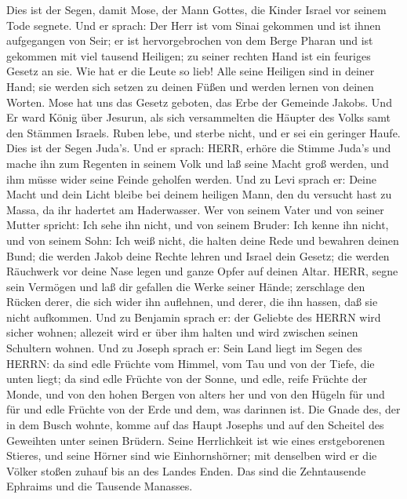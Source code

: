  Dies ist der Segen, damit Mose, der Mann Gottes, die Kinder
Israel vor seinem Tode segnete.  Und er sprach: Der Herr ist
vom Sinai gekommen und ist ihnen aufgegangen von Seir; er ist
hervorgebrochen von dem Berge Pharan und ist gekommen mit viel tausend
Heiligen; zu seiner rechten Hand ist ein feuriges Gesetz an sie.
 Wie hat er die Leute so lieb! Alle seine Heiligen sind in
deiner Hand; sie werden sich setzen zu deinen Füßen und werden lernen
von deinen Worten.  Mose hat uns das Gesetz geboten, das
Erbe der Gemeinde Jakobs.  Und Er ward König über Jesurun,
als sich versammelten die Häupter des Volks samt den Stämmen Israels.
 Ruben lebe, und sterbe nicht, und er sei ein geringer
Haufe.  Dies ist der Segen Juda's. Und er sprach: HERR,
erhöre die Stimme Juda's und mache ihn zum Regenten in seinem Volk und
laß seine Macht groß werden, und ihm müsse wider seine Feinde geholfen
werden.  Und zu Levi sprach er: Deine Macht und dein Licht
bleibe bei deinem heiligen Mann, den du versucht hast zu Massa, da ihr
hadertet am Haderwasser.  Wer von seinem Vater und von
seiner Mutter spricht: Ich sehe ihn nicht, und von seinem Bruder: Ich
kenne ihn nicht, und von seinem Sohn: Ich weiß nicht, die halten deine
Rede und bewahren deinen Bund;  die werden Jakob deine
Rechte lehren und Israel dein Gesetz; die werden Räuchwerk vor deine
Nase legen und ganze Opfer auf deinen Altar.  HERR, segne
sein Vermögen und laß dir gefallen die Werke seiner Hände; zerschlage
den Rücken derer, die sich wider ihn auflehnen, und derer, die ihn
hassen, daß sie nicht aufkommen.  Und zu Benjamin sprach
er: der Geliebte des HERRN wird sicher wohnen; allezeit wird er über ihm
halten und wird zwischen seinen Schultern wohnen.  Und zu
Joseph sprach er: Sein Land liegt im Segen des HERRN: da sind edle
Früchte vom Himmel, vom Tau und von der Tiefe, die unten liegt;
 da sind edle Früchte von der Sonne, und edle, reife
Früchte der Monde,  und von den hohen Bergen von alters her
und von den Hügeln für und für  und edle Früchte von der
Erde und dem, was darinnen ist. Die Gnade des, der in dem Busch wohnte,
komme auf das Haupt Josephs und auf den Scheitel des Geweihten unter
seinen Brüdern.  Seine Herrlichkeit ist wie eines
erstgeborenen Stieres, und seine Hörner sind wie Einhornshörner; mit
denselben wird er die Völker stoßen zuhauf bis an des Landes Enden. Das
sind die Zehntausende Ephraims und die Tausende Manasses. 
